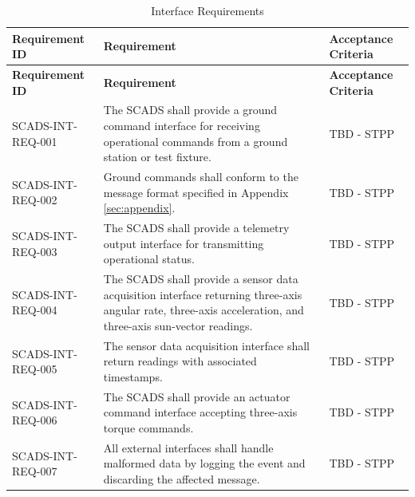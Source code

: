 \documentclass{article}
\begin{document}
        \renewcommand{\arraystretch}{1.4}
        \begin{longtable}{|l|p{9cm}|p{5cm}|}
            \caption{Interface Requirements} \\
            \hline
            \textbf{Requirement ID} & \textbf{Requirement} & 
            \textbf{Acceptance Criteria} \\ \hline
            \endfirsthead

            \hline
            \textbf{Requirement ID} & \textbf{Requirement} & 
            \textbf{Acceptance Criteria} \\ \hline
            \endhead
            \hline
            \endfoot
            SCADS-INT-REQ-001 & The SCADS shall provide a ground command 
                                interface for receiving operational commands
                                from a ground station or test fixture.
                              & TBD - STPP \\ \hline
            SCADS-INT-REQ-002 & Ground commands shall conform to the message 
                                format specified in Appendix \ref{sec:appendix}.
                              & TBD - STPP \\ \hline
            SCADS-INT-REQ-003 & The SCADS shall provide a telemetry output 
                                interface for transmitting operational status.
                              & TBD - STPP \\ \hline
            SCADS-INT-REQ-004 & The SCADS shall provide a sensor data acquisition
                                interface returning three-axis angular rate,
                                three-axis acceleration, and three-axis 
                                sun-vector readings.
                              & TBD - STPP \\ \hline
            SCADS-INT-REQ-005 & The sensor data acquisition interface shall 
                                return readings with associated timestamps.
                              & TBD - STPP \\ \hline
            SCADS-INT-REQ-006 & The SCADS shall provide an actuator command
                                interface accepting three-axis torque commands.
                              & TBD - STPP \\ \hline
            SCADS-INT-REQ-007 & All external interfaces shall handle malformed 
                                data by logging the event and discarding the 
                                affected message.
                              & TBD - STPP \\ \hline
        \end{longtable}
\end{document}
